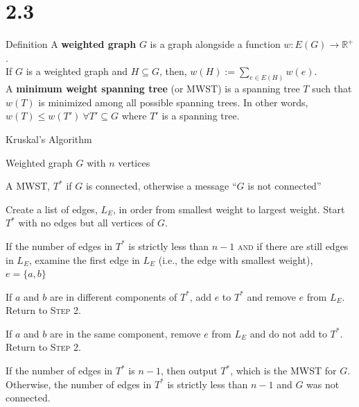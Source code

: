 \documentclass[10pt]{extarticle}
\title{}
\author{Avinash Iyer}
\date{}
\begin{document}
  \section*{2.3}%
  \begin{problem}{Definition}
    A \textbf{weighted graph} $G$ is a graph alongside a function $w: E(G) \rightarrow \mathbb{R}^+$.\\

    If $G$ is a weighted graph and $H\subseteq G$, then, $w(H):=\sum\limits_{e\in E(H)} w(e)$.\\

    A \textbf{minimum weight spanning tree} (or MWST) is a spanning tree $T$ such that $w(T)$ is minimized among all possible spanning trees. In other words, $w(T) \leq w(T')~\forall T'\subseteq G$ where $T'$ is a spanning tree.
  \end{problem}
  \begin{problem}{Kruskal's Algorithm}
    \begin{description}[font=\normalfont\scshape]
      \item[Input] Weighted graph $G$ with $n$ vertices
      \item[Output] A MWST, $T^*$ if $G$ is connected, otherwise a message ``$G$ is not connected''
      \item[Step 1] Create a list of edges, $L_E$, in order from smallest weight to largest weight. Start $T^*$ with no edges but all vertices of $G$.
      \item[Step 2] If the number of edges in $T^*$ is strictly less than $n-1$ \textsc{and} if there are still edges in $L_E$, examine the first edge in $L_E$ (i.e., the edge with smallest weight), $e = \{a,b\}$
        \begin{description}[font=\normalfont\scshape]
          \item[Substep 2.1] If $a$ and $b$ are in different components of $T^*$, add $e$ to $T^*$ and remove $e$ from $L_E$. Return to \textsc{Step 2}.
          \item[Substep 2.2] If $a$ and $b$ are in the same component, remove $e$ from $L_E$ and do not add to $T^*$. Return to \textsc{Step 2}.
        \end{description}
      \item[Step 3] If the number of edges in $T^*$ is $n-1$, then output $T^*$, which is the MWST for $G$. Otherwise, the number of edges in $T^*$ is strictly less than $n-1$ and $G$ was not connected.
    \end{description}
  \end{problem}
\end{document}

